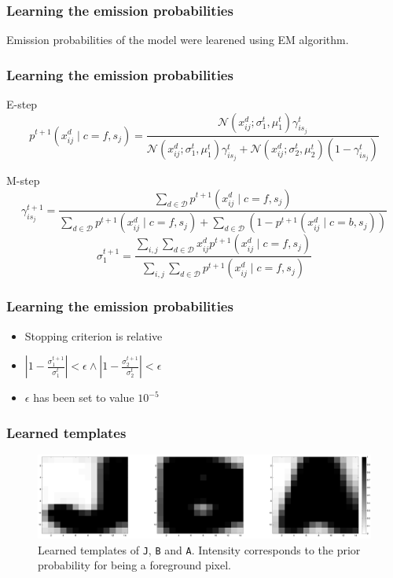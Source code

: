 \documentclass{beamer}
\begin{document}
\begin{frame}
  \frametitle{Learning the emission probabilities}
	Emission probabilities of the model were learened using EM algorithm.
  
\end{frame}

\begin{frame}
  \frametitle{Learning the emission probabilities}
\begin{block}{E-step}
	\[
  p^{t+1}(x^d_{ij} \mid c=f, s_j) =
  \frac{\mathcal{N}(x^d_{ij};\sigma_1^t,\mu_1^t)\gamma_{is_j}^t}{\mathcal{N}(x^d_{ij};\sigma_1^t,\mu_1^t)\gamma_{is_j}^t+\mathcal{N}(x^d_{ij};\sigma_2^t,\mu_2^t)(1-\gamma_{is_j}^t)}
\]
	\end{block}

\begin{block}{M-step}
\[
  \gamma_{is_j}^{t+1} = \frac{\sum_{d \in \mathcal{D}} p^{t+1}(x^d_{ij} \mid
    c=f, s_j)}{\sum_{d \in \mathcal{D}} p^{t+1}(x^d_{ij} \mid c=f,
    s_j) + \sum_{d \in \mathcal{D}} (1-p^{t+1}(x^d_{ij} \mid c=b,
    s_j))}
\]
\[
  \sigma_1^{t+1} = \frac{\sum_{i,j} \sum_{d \in \mathcal{D}} x^d_{
      ij} p^{t+1}(x^d_{ij} \mid c=f, s_j)}{\sum_{i,j} \sum_{d \in
      \mathcal{D}} p^{t+1}(x^d_{ij} \mid c=f, s_j)}
\]
\end{block}  
\end{frame}

\begin{frame}
  \frametitle{Learning the emission probabilities}
\begin{itemize}
\item Stopping criterion is relative
\item  $|1-\frac{\sigma_1^{t+1}}{\sigma_1^{t}}| < \epsilon \wedge |1-\frac{\sigma_2^{t+1}}{\sigma_2^{t}}| < \epsilon$
\item$\epsilon$ has been set to value $10^{-5}$
\end{itemize}  
\end{frame}

\begin{frame}
  \frametitle{Learned templates}
\begin{figure}[htp]
\centering
\includegraphics[width=\linewidth]{pics/jba.png}
\caption{Learned templates of \texttt{J}, \texttt{B} and
  \texttt{A}. Intensity corresponds to the prior probability for being
  a foreground pixel.}
\label{fig:templates}
\end{figure}
\end{frame}
\end{document}

